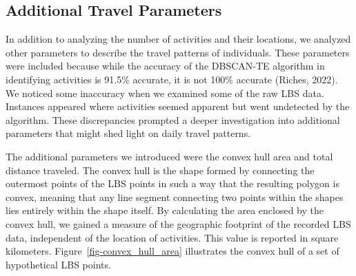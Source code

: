 \documentclass[
  letterpaper,
  number,
  review,
  3p]{elsarticle}
\begin{document}
\subsection{Additional Travel
Parameters}\label{additional-travel-parameters}

In addition to analyzing the number of activities and their locations,
we analyzed other parameters to describe the travel patterns of
individuals. These parameters were included because while the accuracy
of the DBSCAN-TE algorithm in identifying activities is 91.5\% accurate,
it is not 100\% accurate (Riches, 2022). We noticed some inaccuracy when
we examined some of the raw LBS data. Instances appeared where
activities seemed apparent but went undetected by the algorithm. These
discrepancies prompted a deeper investigation into additional parameters
that might shed light on daily travel patterns.

The additional parameters we introduced were the convex hull area and
total distance traveled. The convex hull is the shape formed by
connecting the outermost points of the LBS points in such a way that the
resulting polygon is convex, meaning that any line segment connecting
two points within the shapes lies entirely within the shape itself. By
calculating the area enclosed by the convex hull, we gained a measure of
the geographic footprint of the recorded LBS data, independent of the
location of activities. This value is reported in square kilometers.
Figure~\ref{fig-convex_hull_area} illustrates the convex hull of a set
of hypothetical LBS points.
\end{document}
